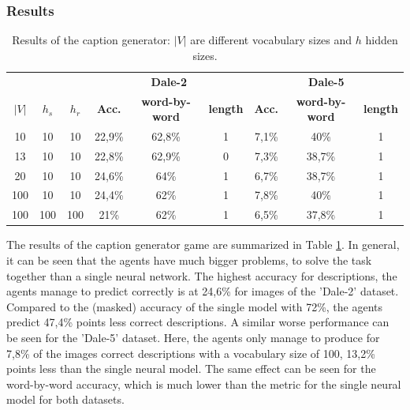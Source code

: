 \subsubsection*{Results}
\begin{table}[h]
    \centering
    \begin{tabular}{ccc|ccc|ccc}
        \toprule
              &         &         & \multicolumn{3}{c}{\textbf{Dale-2}} & \multicolumn{3}{c}{\textbf{Dale-5}}                                                                             \\\cmidrule(lr){4-6}\cmidrule(lr){7-9}
        $|V|$ & $h_{s}$ & $h_{r}$ & \textbf{Acc.}                       & \textbf{word-by-word}               & \textbf{length} & \textbf{Acc.} & \textbf{word-by-word} & \textbf{length} \\\midrule
        {10}  & {10}    & {10}    & {22,9\%}                            & {62,8\%}                            & {1}             & {7,1\%}       & {40\%}                & {1}             \\
        {13}  & {10}    & {10}    & {22,8\%}                            & {62,9\%}                            & {0}             & {7,3\%}       & {38,7\%}              & {1}             \\
        {20}  & {10}    & {10}    & {24,6\%}                            & {64\%}                              & {1}             & {6,7\%}       & {38,7\%}              & {1}             \\
        {100} & {10}    & {10}    & {24,4\%}                            & {62\%}                              & {1}             & {7,8\%}       & {40\%}                & {1}             \\
        {100} & {100}   & {100}   & {21\%}                              & {62\%}                              & {1}             & {6,5\%}       & {37,8\%}              & {1}             \\
        \bottomrule
    \end{tabular}
    \caption{Results of the caption generator: $|V|$ are different vocabulary sizes and $h$ hidden sizes.}
    \label{tab:results_caption_generator_game}
\end{table}

The results of the caption generator game are summarized in Table \ref{tab:results_caption_generator_game}.
In general, it can be seen that the agents have much bigger problems, to solve the task together than a single neural network.
The highest accuracy for descriptions, the agents manage to predict correctly is at 24,6\% for images of the 'Dale-2' dataset.
Compared to the (masked) accuracy of the single model with 72\%, the agents predict 47,4\% points less correct descriptions.
A similar worse performance can be seen for the 'Dale-5' dataset.
Here, the agents only manage to produce for 7,8\% of the images correct descriptions with a vocabulary size of 100, 13,2\% points less than the single neural model.
The same effect can be seen for the word-by-word accuracy, which is much lower than the metric for the single neural model for both datasets.

